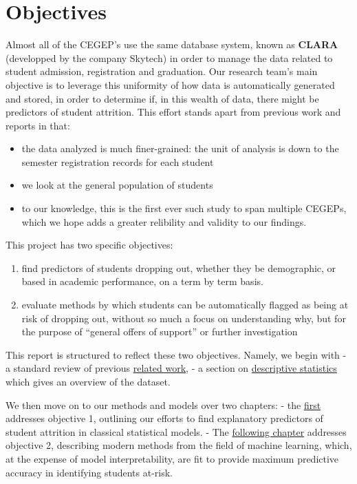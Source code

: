 \documentclass[]{book}
\providecommand{\tightlist}{%
  \setlength{\itemsep}{0pt}\setlength{\parskip}{0pt}}
\theoremstyle{definition}
\theoremstyle{definition}
\theoremstyle{remark}
\begin{document}
\section{Objectives}\label{objectives}

Almost all of the CEGEP's use the same database system, known as
\textbf{CLARA} (developped by the company Skytech) in order to manage
the data related to student admission, registration and graduation. Our
research team's main objective is to leverage this uniformity of how
data is automatically generated and stored, in order to determine if, in
this wealth of data, there might be predictors of student attrition.
This effort stands apart from previous work and reports in that:

\begin{itemize}
\tightlist
\item
  the data analyzed is much finer-grained: the unit of analysis is down
  to the semester registration records for each student
\item
  we look at the general population of students
\item
  to our knowledge, this is the first ever such study to span multiple
  CEGEPs, which we hope adds a greater relibility and validity to our
  findings.
\end{itemize}

This project has two specific objectives:

\begin{enumerate}
\def\labelenumi{\arabic{enumi})}
\tightlist
\item
  find predictors of students dropping out, whether they be demographic,
  or based in academic performance, on a term by term basis.
\item
  evaluate methods by which students can be automatically flagged as
  being at risk of dropping out, without so much a focus on
  understanding why, but for the purpose of ``general offers of
  support'' or further investigation
\end{enumerate}

This report is structured to reflect these two objectives. Namely, we
begin with - a standard review of previous
\protect\hyperlink{littreview}{related work}, - a section on
\protect\hyperlink{descriptive}{descriptive statistics} which gives an
overview of the dataset.

We then move on to our methods and models over two chapters: - the
\protect\hyperlink{explanatory}{first} addresses objective 1, outlining
our efforts to find explanatory predictors of student attrition in
classical statistical models. - The
\protect\hyperlink{predictive}{following chapter} addresses objective 2,
describing modern methods from the field of machine learning, which, at
the expense of model interpretability, are fit to provide maximum
predictive accuracy in identifying students at-risk.
\end{document}
